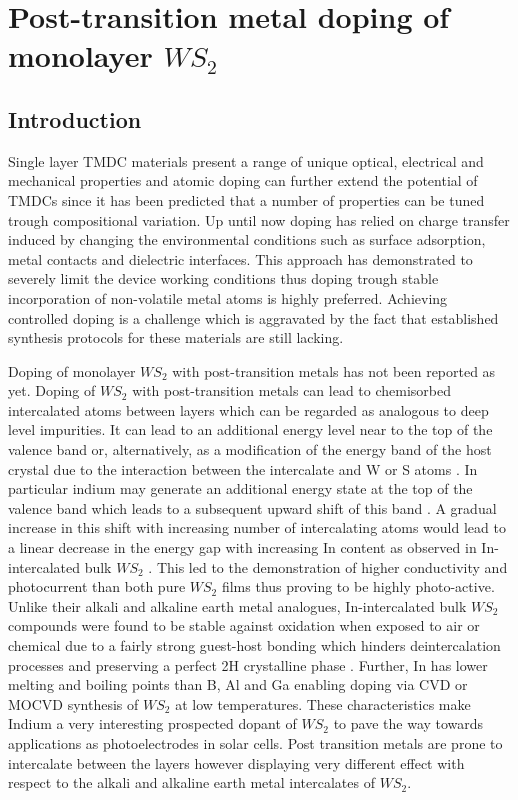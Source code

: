 \chapter{Post-transition metal doping of monolayer $WS_2$}

\section{Introduction}

Single layer TMDC materials present a range of unique optical, electrical and mechanical properties and atomic doping can further extend the potential of TMDCs since it has been predicted that a number of properties can be tuned trough compositional variation. Up until now doping has relied on charge transfer induced by changing the environmental conditions such as surface adsorption, metal contacts and dielectric interfaces. This approach has demonstrated to severely limit the device working conditions thus doping trough stable incorporation of non-volatile metal atoms is highly preferred. Achieving controlled doping is a challenge which is aggravated by the fact that established synthesis protocols for these materials are still lacking.

Doping of monolayer $WS_2$ with post-transition metals has not been reported as yet. Doping of $WS_2$ with post-transition metals can lead to chemisorbed intercalated atoms between layers which can be regarded as analogous to deep level impurities. It can lead to an additional energy level near to the top of the valence band or, alternatively, as a modification of the energy band of the host crystal due to the interaction between the intercalate and W or S atoms \cite{Yacobi1979}\cite{Yacobi1979a}. In particular indium may generate an additional energy state at the top of the valence band which leads to a subsequent upward shift of this band \cite{Deshpande2001}. A gradual increase in this shift with increasing number of intercalating atoms would lead to a linear decrease in the energy gap with increasing In content as observed in In-intercalated bulk $WS_2$ \cite{Deshpande2001}. This led to the demonstration of higher conductivity and photocurrent than both pure $WS_2$ films thus proving to be highly photo-active. Unlike their alkali and alkaline earth metal analogues, In-intercalated bulk $WS_2$ compounds were found to be stable against oxidation when exposed to air or chemical due to a fairly strong guest-host bonding which hinders deintercalation processes and preserving a perfect 2H crystalline phase \cite{Deshpande2001}\cite{Rao1981}. Further, In has lower melting and boiling points than B, Al and Ga enabling doping via CVD or MOCVD synthesis of $WS_2$ at low temperatures. These characteristics make Indium a very interesting prospected dopant of $WS_2$ to pave the way towards applications as photoelectrodes in solar cells. Post transition metals are prone to intercalate between the layers however displaying very different effect with respect to the alkali and alkaline earth metal intercalates of $WS_2$.


